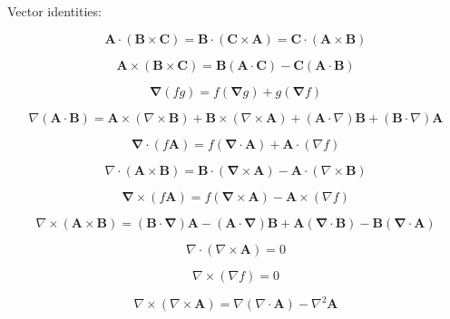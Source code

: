 Vector identities:

\[
\mathbf { A } \cdot ( \mathbf { B } \times \mathbf { C } ) = \mathbf { B } \cdot ( \mathbf { C } \times \mathbf { A } ) = \mathbf { C } \cdot ( \mathbf { A } \times \mathbf { B } )
\]


\[
\mathbf { A } \times ( \mathbf { B } \times \mathbf { C } ) = \mathbf { B } ( \mathbf { A } \cdot \mathbf { C } ) - \mathbf { C } ( \mathbf { A } \cdot \mathbf { B } )
\]


\[
\boldsymbol { \nabla } ( f g ) = f ( \boldsymbol { \nabla } g ) + g ( \boldsymbol { \nabla } f )
\]


\[
\nabla ( \mathbf { A } \cdot \mathbf { B } ) = \mathbf { A } \times ( \nabla \times \mathbf { B } ) + \mathbf { B } \times ( \nabla \times \mathbf { A } ) + ( \mathbf { A } \cdot \nabla ) \mathbf { B } + ( \mathbf { B } \cdot \nabla ) \mathbf { A }
\]


\[
\boldsymbol { \nabla } \cdot ( f \mathbf { A } ) = f ( \mathbf { \nabla } \cdot \mathbf { A } ) + \mathbf { A } \cdot ( \nabla f )
\]


\[
\nabla \cdot ( \mathbf { A } \times \mathbf { B } ) = \mathbf { B } \cdot ( \mathbf { \nabla } \times \mathbf { A } ) - \mathbf { A } \cdot ( \nabla \times \mathbf { B } )
\]


\[
\boldsymbol { \nabla } \times ( f \mathbf { A } ) = f ( \mathbf { \nabla } \times \mathbf { A } ) - \mathbf { A } \times ( \nabla f )
\]


\[
\nabla \times ( \mathbf { A } \times \mathbf { B } ) = ( \mathbf { B } \cdot \mathbf { \nabla } ) \mathbf { A } - ( \mathbf { A } \cdot \mathbf { \nabla } ) \mathbf { B } + \mathbf { A } ( \mathbf { \nabla } \cdot \mathbf { B } ) - \mathbf { B } ( \mathbf { \nabla } \cdot \mathbf { A } )
\]


\[
\nabla \cdot ( \nabla \times \mathbf { A } ) = 0
\]


\[
\nabla \times ( \nabla f ) = 0
\]


\[
\nabla \times ( \nabla \times \mathbf { A } ) = \nabla ( \nabla \cdot \mathbf { A } ) - \nabla ^ { 2 } \mathbf { A }
\]

